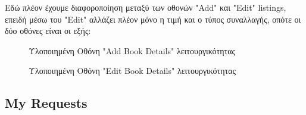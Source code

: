 \documentclass[12pt,a4paper]{article}
\begin{document}
Εδώ πλέον έχουμε διαφοροποίηση μεταξύ των οθονών "Add" και "Edit" listings, επειδή μέσω του "Edit" αλλάζει πλέον μόνο η τιμή και ο τύπος συναλλαγής, οπότε οι δύο οθόνες είναι οι εξής:

\begin{figure}[H]
	\caption{Υλοποιημένη Οθόνη "Add Book Details" λειτουργικότητας}
	\label{Υλοποιημένη Οθόνη "Add Book Details" λειτουργικότητας}
\end{figure}

\begin{figure}[H]
	\caption{Υλοποιημένη Οθόνη "Edit Book Details" λειτουργικότητας}
	\label{Υλοποιημένη Οθόνη "Edit Book Details" λειτουργικότητας}
\end{figure}

\subsection{My Requests}
\end{document}
